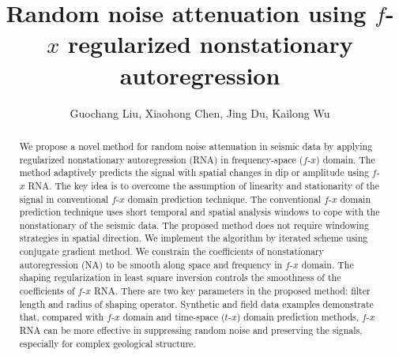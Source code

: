\title{Random noise attenuation using $f$-$x$ regularized nonstationary autoregression}

\author{Guochang Liu\footnotemark[1], Xiaohong Chen\footnotemark[1], Jing Du\footnotemark[2], Kailong Wu\footnotemark[1]}


\address{
\footnotemark[1] China University of Petroleum (Beijing), \\
National Engineering Laboratory for Offshore Oil Exploration, \\
Beijing, China. E-mail: guochang.liu@yahoo.com; chenxh@cup.edu.cn; \\
wuyanping220@163.com
\footnotemark[2]China Petroleum \& Chemical Corporation, \\
Shengli Geophysical Research Institute, China. \\
E-mail: dujing_421@yahoo.com
}


\maketitle

\begin{abstract}
We propose a novel method for random noise attenuation in seismic 
data by applying regularized nonstationary autoregression (RNA) in 
frequency-space ($f$-$x$) domain. The method adaptively predicts the 
signal with spatial changes in dip or amplitude using $f$-$x$ RNA. The 
key idea is to overcome the assumption of linearity and stationarity 
of the signal in conventional $f$-$x$ domain prediction technique. The 
conventional $f$-$x$ domain prediction technique uses short temporal 
and spatial analysis windows to cope with the nonstationary of the 
seismic data. The proposed method does not require windowing 
strategies in spatial direction. We implement the algorithm by 
iterated scheme using conjugate gradient method. We constrain the 
coefficients of nonstationary autoregression (NA) to be smooth 
along space and frequency in $f$-$x$ domain. The shaping regularization 
in least square inversion controls the smoothness of the coefficients 
of $f$-$x$ RNA. There are two key parameters in the proposed method: 
filter length and radius of shaping operator. Synthetic and field 
data examples demonstrate that, compared with $f$-$x$ domain and 
time-space ($t$-$x$) domain prediction methods, $f$-$x$ RNA can be more 
effective in suppressing random noise and preserving the signals, 
especially for complex geological structure. 

\end{abstract}

